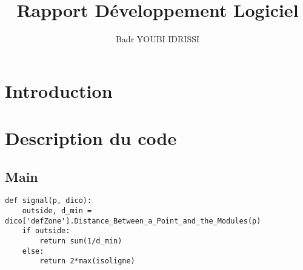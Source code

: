 \documentclass[french]{article}
\title{Rapport Développement Logiciel}
\author{Badr YOUBI IDRISSI}
\begin{document}
	
\section{Introduction}

\section{Description du code}
	
\subsection{Main}
\begin{verbatim}
def signal(p, dico):
	outside, d_min = dico['defZone'].Distance_Between_a_Point_and_the_Modules(p)
	if outside:
		return sum(1/d_min)
	else:
		return 2*max(isoligne)
\end{verbatim}	
\end{document}
